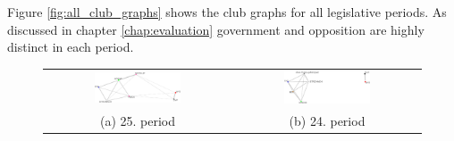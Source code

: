 Figure \ref{fig:all_club_graphs} shows the club graphs for all legislative periods. As discussed in chapter \ref{chap:evaluation} government and opposition are highly distinct in each period.

\begin{figure}[h]
	\center
	\setlength{\tabcolsep}{.26667em}
	\begin{tabular}{ c | c }
		\includegraphics[width=0.48\textwidth]{imgs/graphs/club-graphs/horizontal/graph_25.eps}
		&
		\includegraphics[width=0.48\textwidth]{imgs/graphs/club-graphs/horizontal/graph_24.eps}
		\\
		(a) 25. period
		&
		(b) 24. period
		

\end{tabular}
\end{figure}
